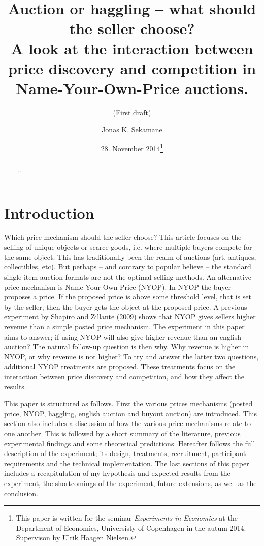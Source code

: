 \documentclass[a4paper,12pt]{article}
\title{\Large {\bf Auction or haggling -- what should the seller choose?} \\ A look at the interaction between price discovery and competition in Name-Your-Own-Price auctions.}
\subtitle{(First draft)}
\author{Jonas K. Sekamane}
\date{28. November 2014\thanks{This paper is written for the seminar \emph{Experiments in Economics} at the Department of Economics, Universisty of Copenhagen in the autum 2014. Supervison by Ulrik Haagen Nielsen.}}
\begin{document}
	
	\clearpage
	\thispagestyle{empty}
	
	\maketitle{}
		
	\newpage
	
	\clearpage %
	\setcounter{page}{1}
	
	\begin{abstract}
		{...}
	\end{abstract}
	
	\tableofcontents
	
	\newpage

	\section{Introduction}

	Which price mechanism should the seller choose? This article focuses on the selling of unique objects or scarce goods, i.e. where multiple buyers compete for the same object. This has traditionally been the realm of auctions (art, antiques, collectibles, etc). But perhaps -- and contrary to popular believe -- the standard single-item auction formats are not the optimal selling methods. An alternative price mechanism is Name-Your-Own-Price (NYOP). In NYOP the buyer proposes a price. If the proposed price is above some threshold level, that is set by the seller, then the buyer gets the object at the proposed price. A previous experiment by Shapiro and Zillante (2009) shows that NYOP gives sellers higher revenue than a simple posted price mechanism. The experiment in this paper aims to answer; if using NYOP will also give higher revenue than an english auction? The natural follow-up question is then why. Why revenue is higher in NYOP, or why revenue is not higher? To try and answer the latter two questions, additional NYOP treatments are proposed. These treatments focus on the interaction between price discovery and competition, and how they affect the results.

	This paper is structured as follows. First the various prices mechanisms (posted price, NYOP, haggling, english auction and buyout auction) are introduced. This section also includes a discussion of how the various price mechanisms relate to one another. This is followed by a short summary of the literature, previous experimental findings and some theoretical predictions. Hereafter follows the full description of the experiment; its design, treatments, recruitment, participant requirements and the technical implementation. The last sections of this paper includes a recapitulation of my hypothesis and expected results from the experiment, the shortcomings of the experiment, future extensions, as well as the conclusion.
\end{document}
